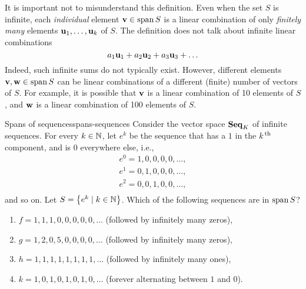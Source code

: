 It is important not to misunderstand this definition.  Even when the
set $S$ is infinite, each {\em individual} element
$\vect{v}\in\sspan S$ is a linear combination of only {\em finitely
  many} elements $\mbox{\bf u}_1,\ldots,\mbox{\bf u}_k$ of $S$.
The definition does not talk about infinite linear combinations
\begin{equation*}
  a_1\mbox{\bf u}_1 + a_2\mbox{\bf u}_2 + a_3\mbox{\bf u}_3 + \ldots
\end{equation*}
Indeed, such infinite sums do not typically exist.  However, different
elements $\vect{v},\vect{w}\in\sspan S$ can be linear combinations of
a different (finite) number of vectors of $S$. For example, it is
possible that $\mbox{\bf v}$ is a linear combination of 10 elements of
$S$, and $\mbox{\bf w}$ is a linear combination of 100 elements of $S$.

\begin{example}{Spans of sequences}{spans-sequences}
  Consider the vector space $\mathbf{Seq}_K$ of infinite sequences. For every
  $k\in\mathbb{N}$, let $e^k$ be the sequence that has a $1$ in the $k^{\,\rm th}$
  component, and is $0$ everywhere else, i.e.,
  \begin{equation*}
    \begin{array}{l}
      e^0 = 1,0,0,0,0,\ldots, \\
      e^1 = 0,1,0,0,0,\ldots, \\
      e^2 = 0,0,1,0,0,\ldots, \\
    \end{array}
  \end{equation*}
  and so on.
  Let $S=\left\{e^k \mid k\in\mathbb{N}\right\}$. Which of the following sequences are in
  $\sspan S$?
  \begin{enumialphparenastyle}
    \begin{enumerate}
    \item $f = 1,1,1,0,0,0,0,0,\ldots$ (followed by infinitely many zeros),
    \item $g = 1,2,0,5,0,0,0,0,\ldots$ (followed by infinitely many zeros),
    \item $h = 1,1,1,1,1,1,1,1,\ldots$ (followed by infinitely many ones),
    \item $k = 1,0,1,0,1,0,1,0,\ldots$ (forever alternating between $1$ and $0$).
    \end{enumerate}
  \end{enumialphparenastyle}
\end{example}

